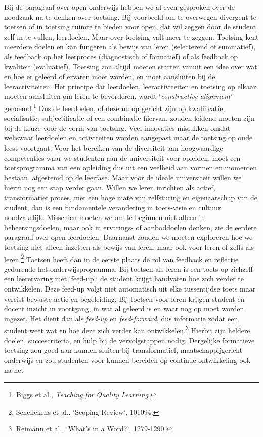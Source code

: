 \documentclass[smallauthor, chapterhaspagenum, nochapterinheader, pagenuminheader,  bigchapnum,medium2, tocpages, garamond, titleinheader]{jote-book}
\begin{document}
	Bij de paragraaf over open onderwijs hebben we al even gesproken over de noodzaak na te denken over toetsing. Bij voorbeeld om te overwegen divergent te toetsen of in toetsing ruimte te bieden voor open, dat wil zeggen door de student zelf in te vullen, leerdoelen. Maar over toetsing valt meer te zeggen. Toetsing kent meerdere doelen en kan fungeren als bewijs van leren (selecterend of summatief), als feedback op het leerproces (diagnostisch of formatief) of als feedback op kwaliteit (evaluatief). Toetsing zou altijd moeten starten vanuit een idee over wat en hoe er geleerd of ervaren moet worden, en moet aansluiten bij de leeractiviteiten. Het principe dat leerdoelen, leeractiviteiten en toetsing op elkaar moeten aansluiten om leren te bevorderen, wordt ‘\emph{constructive}\emph{ }\emph{alignment}' genoemd.\footnote{Biggs et al., \emph{Teaching }\emph{for}\emph{ }\emph{Quality}\emph{ Learning}.} Dus de leerdoelen, of deze nu op gericht zijn op kwalificatie, socialisatie, subjectificatie of een combinatie hiervan, zouden leidend moeten zijn bij de keuze voor de vorm van toetsing. Veel innovaties mislukken omdat weliswaar leerdoelen en activiteiten worden aangepast maar de toetsing op oude leest voortgaat. Voor het bereiken van de diversiteit aan hoogwaardige competenties waar we studenten aan de universiteit voor opleiden, moet een toetsprogramma van een opleiding dus uit een veelheid aan vormen en momenten bestaan, afgestemd op de leerfase. Maar voor de ideale universiteit willen we hierin nog een stap verder gaan. Willen we leren inrichten als actief, transformatief proces, met een hoge mate van zelfsturing en eigenaarschap van de student, dan is een fundamentele verandering in toets-visie en cultuur noodzakelijk. Misschien moeten we om te beginnen niet alleen in beheersingsdoelen, maar ook in ervarings- of aanboddoelen denken, zie de eerdere paragraaf over open leerdoelen. Daarnaast zouden we moeten exploreren hoe we toetsing niet alleen inzetten als bewijs van leren, maar ook voor leren of zelfs als leren.\footnote{Schellekens et al., ‘Scoping Review', 101094.} Toetsen heeft dan in de eerste plaats de rol van feedback en reflectie gedurende het onderwijsprogramma. Bij toetsen als leren is een toets op zichzelf een leerervaring met ‘feed-up': de student krijgt handvaten hoe zich verder te ontwikkelen. Deze feed-up volgt niet automatisch uit elke tussentijdse toets maar vereist bewuste actie en begeleiding. Bij toetsen voor leren krijgen student en docent inzicht in voortgang, in wat al geleerd is en waar nog op moet worden ingezet. Het dient dan als \emph{feed-up} en \emph{feed-forward}, dus informatie zodat een student weet wat en hoe deze zich verder kan ontwikkelen.\footnote{Reimann et al., ‘What's in a Word?', 1279-1290.} Hierbij zijn heldere doelen, succescriteria, en hulp bij de vervolgstappen nodig. Dergelijke formatieve toetsing zou goed aan kunnen sluiten bij transformatief, maatschappijgericht onderwijs en zou studenten voor kunnen bereiden op continue ontwikkeling ook na het 
\end{document}
